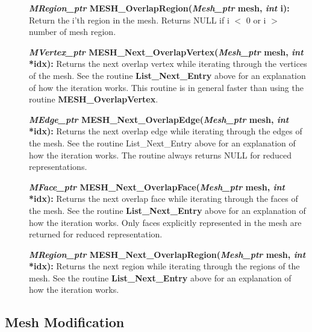 \documentclass[12pt]{article}
\begin{document}
\begin{description}
  \item[]{\bf {\em MRegion\_ptr} MESH\_OverlapRegion({\em Mesh\_ptr} mesh, {\em
        int} i):} Return the i'th region in the mesh. Returns NULL if i
    $<$ 0 or i $>$ number of mesh region.

  \item[]

  \item[]{\bf {\em MVertex\_ptr} MESH\_Next\_OverlapVertex({\em Mesh\_ptr}
      mesh, {\em int} *idx):} Returns the next overlap vertex while iterating
    through the vertices of the mesh. See the routine {\bf
      List\_Next\_Entry} above for an explanation of how the iteration
    works. This routine is in general faster than using the routine {\bf
      MESH\_OverlapVertex}.

  \item[]{\bf {\em MEdge\_ptr} MESH\_Next\_OverlapEdge({\em Mesh\_ptr} mesh,
      {\em int} *idx):} Returns the next overlap edge while iterating through the
    edges of the mesh. See the routine List\_Next\_Entry above for an
    explanation of how the iteration works.  The routine always returns
    NULL for reduced representations.

  \item[]{\bf {\em MFace\_ptr} MESH\_Next\_OverlapFace({\em Mesh\_ptr} mesh,
      {\em int} *idx):} Returns the next overlap face while iterating through the
    faces of the mesh. See the routine {\bf List\_Next\_Entry} above for
    an explanation of how the iteration works.  Only faces explicitly
    represented in the mesh are returned for reduced representation.

  \item[]{\bf {\em MRegion\_ptr}
      MESH\_Next\_OverlapRegion({\em Mesh\_ptr} mesh, {\em int} *idx):}
    Returns the next region while iterating through the regions of the
    mesh. See the routine {\bf List\_Next\_Entry} above for an
    explanation of how the iteration works.
    
\end{description}



\newpage
\subsection{Mesh Modification}
\end{document}
